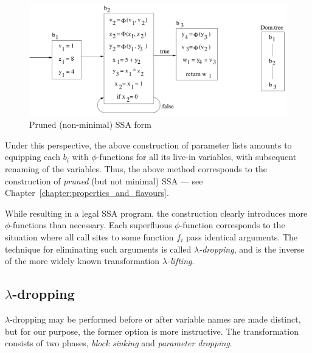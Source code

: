\begin{figure}
\begin{center}
\includegraphics[scale=0.4]{SSAConstructionExample2}
\end{center}
\caption{\label{fig:FunctionalCorrespondenceRunningExampleInitialSSA} Pruned (non-minimal) SSA form}
\end{figure}

Under this perspective, the above construction of parameter lists
amounts to equipping each $b_i$ with $\phi$-functions for all its
live-in variables, with subsequent renaming of the variables. Thus,
the above method corresponds to the construction of \emph{pruned} (but
not minimal) SSA --- see Chapter~\ref{chapter:properties_and_flavours}.

While resulting in a legal SSA program, the construction clearly
introduces more $\phi$-functions than necessary. Each superfluous
$\phi$-function corresponds to the situation where all call sites to
some function $f_i$ pass identical arguments. The technique for
eliminating such arguments is called
\emph{$\lambda$-dropping}, and is
the inverse of the more widely known transformation
\emph{$\lambda$-lifting}. 

\subsection{$\lambda$-dropping}
\label{section:Part1:Semantics:lambdaDropping}

$\lambda$-dropping may be performed before or after variable names are
made distinct, but for our purpose, the former option is more
instructive.  The transformation consists of two phases, \emph{block
sinking} and \emph{parameter dropping}.

